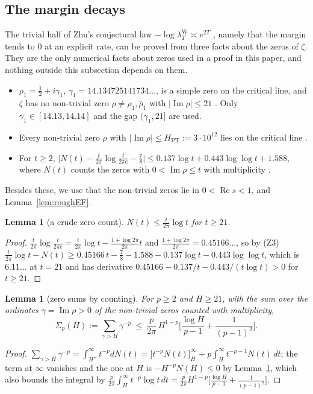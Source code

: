 \documentclass[11pt]{amsart}
\newtheorem{lemma}[theorem]{Lemma}
\theoremstyle{definition}
\theoremstyle{remark}
\newcommand{\Rel}{\operatorname{Re}}
\newcommand{\Iml}{\operatorname{Im}}
\newcommand{\lamW}{\lambda^{\mathrm W}_T}
\begin{document}
\subsection{The margin decays}\label{subsec:margin}
The trivial half of Zhu's conjectural law $-\log\lamW\asymp e^{2T}$ \cite[Conj.~12.1]{Zhu2026}, namely that
the margin tends to $0$ at an explicit rate, can be proved from three facts about the zeros of $\zeta$.
They are the only numerical facts about zeros used in a proof in this paper, and nothing outside this
subsection depends on them.
\begin{itemize}
\item[(Z1)] $\rho_1=\frac12+i\gamma_1$, $\gamma_1=14.134725141734\ldots$, is a simple zero on the critical line,
and $\zeta$ has no non-trivial zero $\rho\ne\rho_1,\bar\rho_1$ with $|\Iml\rho|\le21$
\cite{RosserYoheSchoenfeld1968,PlattTrudgian2021}. Only $\gamma_1\in[14.13,14.14]$ and the gap $(\gamma_1,21]$
are used.
\item[(Z2)] Every non-trivial zero $\rho$ with $|\Iml\rho|\le H_{\mathrm{PT}}:=3\cdot10^{12}$ lies on the
critical line \cite{PlattTrudgian2021}.
\item[(Z3)] For $t\ge2$, $\big|N(t)-\frac t{2\pi}\log\frac t{2\pi e}-\frac78\big|\le0.137\log t+0.443\log\log t+1.588$,
where $N(t)$ counts the zeros with $0<\Iml\rho\le t$ with multiplicity \cite[Thm.~19]{Rosser1941}.
\end{itemize}
Besides these, we use that the non-trivial zeros lie in $0<\Rel s<1$, and Lemma~\ref{lem:roughEF}.
\begin{lemma}[a crude zero count]\label{lem:Ncount}
$N(t)\le\frac t{2\pi}\log t$ for $t\ge21$.
\end{lemma}
\begin{proof}
$\frac t{2\pi}\log\frac t{2\pi e}=\frac t{2\pi}\log t-\frac{1+\log2\pi}{2\pi}t$ and
$\frac{1+\log2\pi}{2\pi}=0.45166\ldots$, so by (Z3)
$\frac t{2\pi}\log t-N(t)\ge0.45166\,t-\frac78-1.588-0.137\log t-0.443\log\log t$, which is $6.11\ldots$ at
$t=21$ and has derivative $0.45166-0.137/t-0.443/(t\log t)>0$ for $t\ge21$.
\end{proof}

\begin{lemma}[zero sums by counting]\label{lem:zerosum}
For $p\ge2$ and $H\ge21$, with the sum over the ordinates $\gamma=\Iml\rho>0$ of the non-trivial zeros
counted with multiplicity,
\[
\Sigma_p(H):=\sum_{\gamma>H}\gamma^{-p}\ \le\ \frac p{2\pi}\,H^{1-p}\Big[\frac{\log H}{p-1}+\frac1{(p-1)^2}\Big].
\]
\end{lemma}
\begin{proof}
$\sum_{\gamma>H}\gamma^{-p}=\int_{H^+}^\infty t^{-p}dN(t)=\big[t^{-p}N(t)\big]_H^\infty+p\int_H^\infty t^{-p-1}N(t)\,dt$;
the term at $\infty$ vanishes and the one at $H$ is $-H^{-p}N(H)\le0$ by Lemma~\ref{lem:Ncount}, which
also bounds the integral by $\frac p{2\pi}\int_H^\infty t^{-p}\log t\,dt=\frac p{2\pi}H^{1-p}\big[\frac{\log H}{p-1}+\frac1{(p-1)^2}\big]$.
\end{proof}
\end{document}

